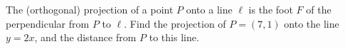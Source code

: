 The (orthogonal) projection of a point \(P\) onto a line \(\ell\) is the foot \(F\) of the perpendicular from \(P\) to \(\ell\). Find the projection of \(P=(7,1)\) onto the line \(y=2x\), and the distance from \(P\) to this line.
